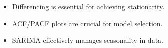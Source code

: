 \documentclass[11pt,a4paper]{article}
\begin{document}
\vspace{4pt}
\begin{itemize}[leftmargin=18pt,itemsep=2pt]
  \item Differencing is essential for achieving stationarity.
  \item ACF/PACF plots are crucial for model selection.
  \item SARIMA effectively manages seasonality in data.
\end{itemize}
\end{document}
